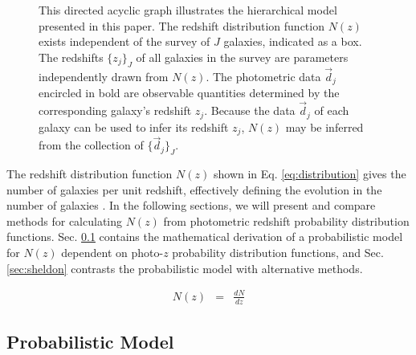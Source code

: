 \documentclass[preprint]{aastex}
\begin{document}
\begin{figure}
\vspace{0.5cm}
\begin{center}
\caption{This directed acyclic graph illustrates the hierarchical model 
presented in this paper.  The redshift distribution function $N(z)$ exists 
independent of the survey of $J$ galaxies, indicated as a box.  The redshifts 
$\{z_{j}\}_{J}$ of all galaxies in the survey are parameters independently 
drawn from $N(z)$.  The photometric data $\vec{d}_{j}$ encircled in bold are 
observable quantities determined by the corresponding galaxy's redshift 
$z_{j}$.  Because the data $\vec{d}_{j}$ of each galaxy can be used to infer 
its redshift $z_{j}$, $N(z)$ may be inferred from the collection of 
$\{\vec{d}_{j}\}_{J}$.}
\label{fig:flow}
\end{center}
\end{figure}

The redshift distribution function $N(z)$ shown in Eq. \ref{eq:distribution} 
gives the number of galaxies per unit redshift, effectively defining the 
evolution in the number of galaxies \citep{Menard2013}.  In the following 
sections, we will present and compare methods for calculating $N(z)$ from 
photometric redshift probability distribution functions.  Sec. \ref{sec:prob} 
contains the mathematical derivation of a probabilistic model for $N(z)$ 
dependent on photo-$z$ probability distribution functions, and Sec. 
\ref{sec:sheldon} contrasts the probabilistic model with alternative methods.

\begin{eqnarray}
\label{eq:distribution}
N(z) &=& \frac{dN}{dz}
\end{eqnarray}

\clearpage
\subsection{Probabilistic Model}
\label{sec:prob}
\end{document}
